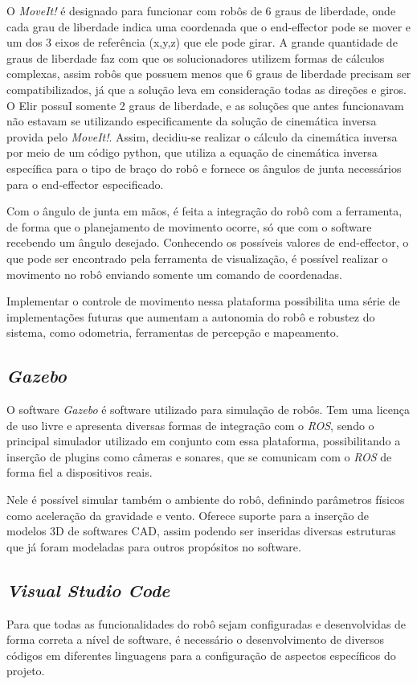 O \textit{MoveIt!} é designado para funcionar com robôs de 6 graus de liberdade, onde cada grau de liberdade indica uma coordenada que o end-effector pode se mover e um dos 3 eixos de referência (x,y,z) que ele pode girar. A grande quantidade de graus de liberdade faz com que os solucionadores utilizem formas de cálculos complexas, assim robôs que possuem menos que 6 graus de liberdade precisam ser compatibilizados, já que a solução leva em consideração todas as direções e giros. O Elir possuI somente 2 graus de liberdade, e as soluções que antes funcionavam não estavam se utilizando especificamente da solução de cinemática inversa provida pelo \textit{MoveIt!}. Assim, decidiu-se realizar o cálculo da cinemática inversa por meio de um código python, que utiliza a equação de cinemática inversa específica para o tipo de braço do robô e fornece os ângulos de junta necessários para o end-effector especificado. 

Com o ângulo de junta em mãos, é feita a integração do robô com a ferramenta, de forma que o planejamento de movimento ocorre, só que com o software recebendo um ângulo desejado. Conhecendo os possíveis valores de end-effector, o que pode ser encontrado pela ferramenta de visualização, é possível realizar o movimento no robô enviando somente um comando de coordenadas.

Implementar o controle de movimento nessa plataforma possibilita uma série de implementações futuras que aumentam a autonomia do robô e robustez do sistema, como odometria, ferramentas de percepção e mapeamento.

\subsection{\textit{Gazebo}}
O software \textit{Gazebo} é software utilizado para simulação de robôs. Tem uma licença de uso livre e apresenta diversas formas de integração com o \textit{ROS}, sendo o principal simulador utilizado em conjunto com essa plataforma, possibilitando a inserção de plugins como câmeras e sonares, que se comunicam com o \textit{ROS} de forma fiel a dispositivos reais.

Nele é possível simular também o ambiente do robô, definindo parâmetros físicos como aceleração da gravidade e vento. Oferece suporte para a inserção de modelos 3D de softwares CAD, assim podendo ser inseridas diversas estruturas que já foram modeladas para outros propósitos no software.

\subsection{\textit{Visual Studio Code}}
Para que todas as funcionalidades do robô sejam configuradas e desenvolvidas de forma correta a nível de software, é necessário o desenvolvimento de diversos códigos em diferentes linguagens para a configuração de aspectos específicos do projeto.

